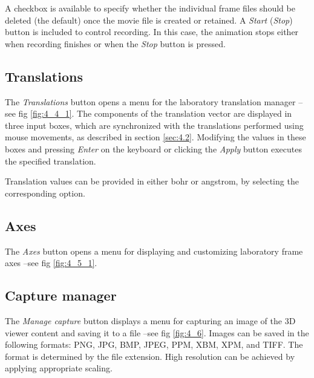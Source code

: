 \documentclass[10pt]{article}
\begin{document}
A checkbox is available to specify whether the individual frame files should be deleted  
(the default) once the movie file is created or retained.  
A {\it Start} ({\it Stop}) button is included to control recording.  
In this case, the animation stops either when recording finishes or when the {\it Stop} button is pressed.  



\subsection{Translations \label{sec:4.4}}

The {\it Translations} button opens a menu for the laboratory translation manager --see fig \ref{fig:4_4_1}.  
The components of the translation vector are displayed in three input boxes,  
which are synchronized with the translations performed using mouse movements,  
as described in section \ref{sec:4.2}.  
Modifying the values in these boxes and pressing {\it Enter} on the keyboard  
or clicking the {\it Apply} button executes the specified translation.  

Translation values can be provided in either bohr or angstrom,  
by selecting the corresponding option.  


\subsection{Axes \label{sec:4.5}}

The {\it Axes} button opens a menu for displaying 
and customizing laboratory frame axes --see fig \ref{fig:4_5_1}. 


\subsection{Capture manager \label{sec:4.6}}

The {\it Manage capture} button displays a menu for capturing an image of the 3D viewer content  
and saving it to a file --see fig \ref{fig:4_6}.  
Images can be saved in the following formats: PNG, JPG, BMP, JPEG, PPM, XBM, XPM, and TIFF.  
The format is determined by the file extension.  
High resolution can be achieved by applying appropriate scaling.  
\end{document}
